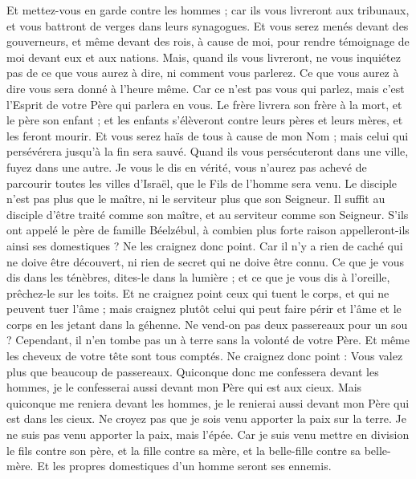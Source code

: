 \begin{multicols}{2}
Et mettez-vous en garde contre les hommes ; car ils vous livreront aux tribunaux, et vous battront de verges dans leurs synagogues.
Et vous serez menés devant des gouverneurs, et même devant des rois, à cause de moi, pour rendre témoignage de moi devant eux et aux nations.
Mais, quand ils vous livreront, ne vous inquiétez pas de ce que vous aurez à dire, ni comment vous parlerez. Ce que vous aurez à dire vous sera donné à l’heure même.
Car ce n'est pas vous qui parlez, mais c'est l'Esprit de votre Père qui parlera en vous.
Le frère livrera son frère à la mort, et le père son enfant ; et les enfants s'élèveront contre leurs pères et leurs mères, et les feront mourir.
Et vous serez haïs de tous à cause de mon Nom ; mais celui qui persévérera jusqu’à la fin sera sauvé.
Quand ils vous persécuteront dans une ville, fuyez dans une autre. Je vous le dis en vérité, vous n'aurez pas achevé de parcourir toutes les villes d'Israël, que le Fils de l'homme sera venu.
Le disciple n'est pas plus que le maître, ni le serviteur plus que son Seigneur.
Il suffit au disciple d'être traité comme son maître, et au serviteur comme son Seigneur. S’ils ont appelé le père de famille Béelzébul, à combien plus forte raison appelleront-ils ainsi ses domestiques ?
Ne les craignez donc point. Car il n'y a rien de caché qui ne doive être découvert, ni rien de secret qui ne doive être connu.
Ce que je vous dis dans les ténèbres, dites-le dans la lumière ; et ce que je vous dis à l'oreille, prêchez-le sur les toits.
Et ne craignez point ceux qui tuent le corps, et qui ne peuvent tuer l'âme ; mais craignez plutôt celui qui peut faire périr et l'âme et le corps en les jetant dans la géhenne.
Ne vend-on pas deux passereaux pour un sou ? Cependant, il n’en tombe pas un à terre sans la volonté de votre Père.
Et même les cheveux de votre tête sont tous comptés.
Ne craignez donc point : Vous valez plus que beaucoup de passereaux.
Quiconque donc me confessera devant les hommes, je le confesserai aussi devant mon Père qui est aux cieux.
Mais quiconque me reniera devant les hommes, je le renierai aussi devant mon Père qui est dans les cieux.
Ne croyez pas que je sois venu apporter la paix sur la terre. Je ne suis pas venu apporter la paix, mais l'épée.
Car je suis venu mettre en division le fils contre son père, et la fille contre sa mère, et la belle-fille contre sa belle-mère.
Et les propres domestiques d'un homme seront ses ennemis.

\end{multicols}
